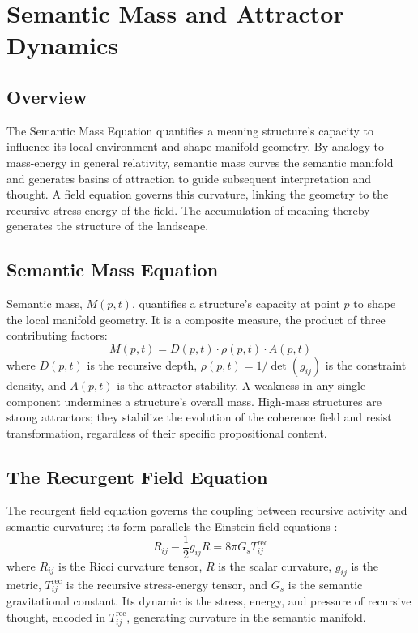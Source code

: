 \chapter{Semantic Mass and Attractor Dynamics}

\section{Overview}

The Semantic Mass Equation quantifies a meaning structure's capacity to influence its local environment and shape manifold geometry. By analogy to mass-energy in general relativity, semantic mass curves the semantic manifold and generates basins of attraction to guide subsequent interpretation and thought. A field equation governs this curvature, linking the geometry to the recursive stress-energy of the field. The accumulation of meaning thereby generates the structure of the landscape.

\section{Semantic Mass Equation}

Semantic mass, \(M(p,t)\), quantifies a structure's capacity at point \(p\) to shape the local manifold geometry. It is a composite measure, the product of three contributing factors:
\begin{equation}
M(p, t) = D(p, t) \cdot \rho(p, t) \cdot A(p, t)
\end{equation}
where \(D(p, t)\) is the recursive depth, \(\rho(p, t) = 1/\det(g_{ij})\) is the constraint density, and \(A(p, t)\) is the attractor stability. A weakness in any single component undermines a structure's overall mass. High-mass structures are strong attractors; they stabilize the evolution of the coherence field and resist transformation, regardless of their specific propositional content.

\section{The Recurgent Field Equation}

The recurgent field equation governs the coupling between recursive activity and semantic curvature; its form parallels the Einstein field equations \autocite{Einstein1915, MisnerThorneWheeler1973, Wald1984}:
\begin{equation}
R_{ij} - \frac{1}{2}g_{ij}R = 8\pi G_s T^{\text{rec}}_{ij}
\end{equation}
where \(R_{ij}\) is the Ricci curvature tensor, \(R\) is the scalar curvature, \(g_{ij}\) is the metric, \(T^{\text{rec}}_{ij}\) is the recursive stress-energy tensor, and \(G_s\) is the semantic gravitational constant. Its dynamic is the stress, energy, and pressure of recursive thought, encoded in \(T^{\text{rec}}_{ij}\), generating curvature in the semantic manifold.

